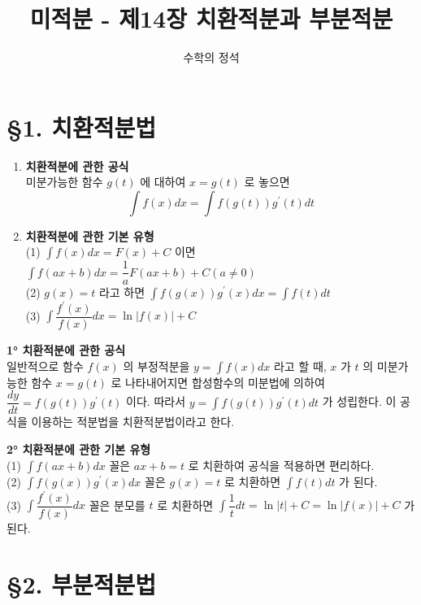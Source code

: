 \documentclass[a4paper,11pt]{article}
\title{\textbf{미적분 - 제14장 치환적분과 부분적분}}
\author{수학의 정석}
\date{}
\begin{document}
\maketitle

\section*{§1. 치환적분법}

\begin{conceptbox}[기본 정석]
\begin{enumerate}
    \item \textbf{치환적분에 관한 공식} \\
    미분가능한 함수 $g(t)$ 에 대하여 $x=g(t)$ 로 놓으면
    \[ \int f(x)dx=\int f(g(t))g^{\prime}(t)dt \]
    \item \textbf{치환적분에 관한 기본 유형} \\
    (1) $\int f(x)dx=F(x)+C$ 이면 $\int f(ax+b)dx=\dfrac{1}{a}F(ax+b)+C(a\ne0)$ \\
    (2) $g(x)=t$ 라고 하면 $\int f(g(x))g^{\prime}(x)dx=\int f(t)dt$ \\
    (3) $\int\dfrac{f^{\prime}(x)}{f(x)}dx=\ln|f(x)|+C$
\end{enumerate}
\end{conceptbox}

\begin{advicebox}
\textbf{1° 치환적분에 관한 공식} \\
일반적으로 함수 $f(x)$ 의 부정적분을 $y=\int f(x)dx$ 라고 할 때, $x$ 가 $t$ 의 미분가능한 함수 $x=g(t)$ 로 나타내어지면 합성함수의 미분법에 의하여 $\dfrac{dy}{dt}=f(g(t))g^{\prime}(t)$ 이다. 따라서 $y=\int f(g(t))g^{\prime}(t)dt$ 가 성립한다. 이 공식을 이용하는 적분법을 치환적분법이라고 한다.
\end{advicebox}

\begin{advicebox}
\textbf{2° 치환적분에 관한 기본 유형} \\
(1) $\int f(ax+b)dx$ 꼴은 $ax+b=t$ 로 치환하여 공식을 적용하면 편리하다. \\
(2) $\int f(g(x))g^{\prime}(x)dx$ 꼴은 $g(x)=t$ 로 치환하면 $\int f(t)dt$ 가 된다. \\
(3) $\int\dfrac{f^{\prime}(x)}{f(x)}dx$ 꼴은 분모를 $t$ 로 치환하면 $\int \dfrac{1}{t}dt = \ln|t|+C = \ln|f(x)|+C$ 가 된다.
\end{advicebox}

\section*{§2. 부분적분법}
\end{document}
